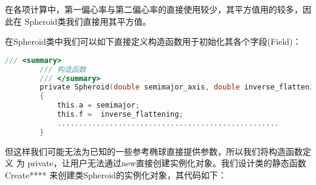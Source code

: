在各项计算中，第一偏心率与第二偏心率的直接使用较少，其平方值用的较多，因此在
Spheroid类我们直接用其平方值。

 在Spheroid类中我们可以如下直接定义构造函数用于初始化其各个字段(Field)：
  \begin{lstlisting}[language=C]
        /// <summary>
        /// 构造函数
        /// </summary>
        private Spheroid(double semimajor_axis, double inverse_flattening)
        {
            this.a = semimajor;
            this.f =  inverse_flattening;
            ...................................................
        }
\end{lstlisting}

但这样我们可能无法为已知的一些参考椭球直接提供参数，所以我们将构造函数定义
为 private，让用户无法通过new直接创建实例化对象。我们设计类的静态函数
Create**** 来创建类Spheroid的实例化对象，其代码如下：

